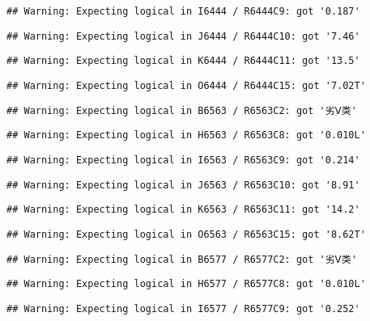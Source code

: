 \documentclass[
]{article}
\begin{document}
\begin{verbatim}
## Warning: Expecting logical in I6444 / R6444C9: got '0.187'
\end{verbatim}

\begin{verbatim}
## Warning: Expecting logical in J6444 / R6444C10: got '7.46'
\end{verbatim}

\begin{verbatim}
## Warning: Expecting logical in K6444 / R6444C11: got '13.5'
\end{verbatim}

\begin{verbatim}
## Warning: Expecting logical in O6444 / R6444C15: got '7.02T'
\end{verbatim}

\begin{verbatim}
## Warning: Expecting logical in B6563 / R6563C2: got '劣Ⅴ类'
\end{verbatim}

\begin{verbatim}
## Warning: Expecting logical in H6563 / R6563C8: got '0.010L'
\end{verbatim}

\begin{verbatim}
## Warning: Expecting logical in I6563 / R6563C9: got '0.214'
\end{verbatim}

\begin{verbatim}
## Warning: Expecting logical in J6563 / R6563C10: got '8.91'
\end{verbatim}

\begin{verbatim}
## Warning: Expecting logical in K6563 / R6563C11: got '14.2'
\end{verbatim}

\begin{verbatim}
## Warning: Expecting logical in O6563 / R6563C15: got '8.62T'
\end{verbatim}

\begin{verbatim}
## Warning: Expecting logical in B6577 / R6577C2: got '劣Ⅴ类'
\end{verbatim}

\begin{verbatim}
## Warning: Expecting logical in H6577 / R6577C8: got '0.010L'
\end{verbatim}

\begin{verbatim}
## Warning: Expecting logical in I6577 / R6577C9: got '0.252'
\end{verbatim}
\end{document}
